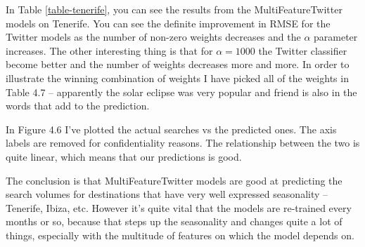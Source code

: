 \documentclass[minf,twoside,singlespacing,parskip,frontabs]{infthesis}
\begin{document}
In Table \ref{table-tenerife}, you can see the results from the MultiFeatureTwitter models on Tenerife. You can see the definite improvement in RMSE for the Twitter models as the number of non-zero weights decreases and the $\alpha$ parameter increases. The other interesting thing is that for $\alpha=1000$ the Twitter classifier become better and the number of weights decreases more and more. In order to illustrate the winning combination of weights I have picked all of the weights in Table 4.7 -- apparently the solar eclipse was very popular and friend is also in the words that add to the prediction. 


In Figure 4.6 I've plotted the actual searches vs the predicted ones. The axis labels are removed for confidentiality reasons. The relationship between the two is quite linear, which means that our predictions is good. 

The conclusion is that MultiFeatureTwitter models are good at predicting the search volumes for destinations that have very well expressed seasonality -- Tenerife, Ibiza, etc. However it's quite vital that the models are re-trained every months or so, because that steps up the seasonality and changes quite a lot of things, especially with the multitude of features on which the model depends on. 
\end{document}

